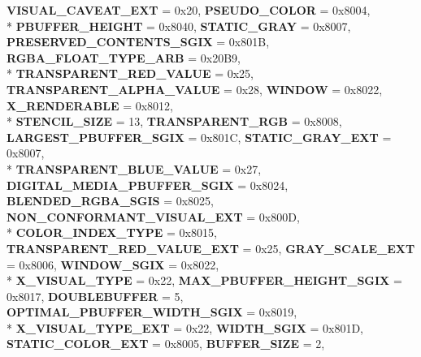 \begin{DoxyCompactItemize}
{\bfseries V\-I\-S\-U\-A\-L\-\_\-\-C\-A\-V\-E\-A\-T\-\_\-\-E\-X\-T} = 0x20, 
{\bfseries P\-S\-E\-U\-D\-O\-\_\-\-C\-O\-L\-O\-R} = 0x8004, 
\\*
{\bfseries P\-B\-U\-F\-F\-E\-R\-\_\-\-H\-E\-I\-G\-H\-T} = 0x8040, 
{\bfseries S\-T\-A\-T\-I\-C\-\_\-\-G\-R\-A\-Y} = 0x8007, 
{\bfseries P\-R\-E\-S\-E\-R\-V\-E\-D\-\_\-\-C\-O\-N\-T\-E\-N\-T\-S\-\_\-\-S\-G\-I\-X} = 0x801\-B, 
{\bfseries R\-G\-B\-A\-\_\-\-F\-L\-O\-A\-T\-\_\-\-T\-Y\-P\-E\-\_\-\-A\-R\-B} = 0x20\-B9, 
\\*
{\bfseries T\-R\-A\-N\-S\-P\-A\-R\-E\-N\-T\-\_\-\-R\-E\-D\-\_\-\-V\-A\-L\-U\-E} = 0x25, 
{\bfseries T\-R\-A\-N\-S\-P\-A\-R\-E\-N\-T\-\_\-\-A\-L\-P\-H\-A\-\_\-\-V\-A\-L\-U\-E} = 0x28, 
{\bfseries W\-I\-N\-D\-O\-W} = 0x8022, 
{\bfseries X\-\_\-\-R\-E\-N\-D\-E\-R\-A\-B\-L\-E} = 0x8012, 
\\*
{\bfseries S\-T\-E\-N\-C\-I\-L\-\_\-\-S\-I\-Z\-E} = 13, 
{\bfseries T\-R\-A\-N\-S\-P\-A\-R\-E\-N\-T\-\_\-\-R\-G\-B} = 0x8008, 
{\bfseries L\-A\-R\-G\-E\-S\-T\-\_\-\-P\-B\-U\-F\-F\-E\-R\-\_\-\-S\-G\-I\-X} = 0x801\-C, 
{\bfseries S\-T\-A\-T\-I\-C\-\_\-\-G\-R\-A\-Y\-\_\-\-E\-X\-T} = 0x8007, 
\\*
{\bfseries T\-R\-A\-N\-S\-P\-A\-R\-E\-N\-T\-\_\-\-B\-L\-U\-E\-\_\-\-V\-A\-L\-U\-E} = 0x27, 
{\bfseries D\-I\-G\-I\-T\-A\-L\-\_\-\-M\-E\-D\-I\-A\-\_\-\-P\-B\-U\-F\-F\-E\-R\-\_\-\-S\-G\-I\-X} = 0x8024, 
{\bfseries B\-L\-E\-N\-D\-E\-D\-\_\-\-R\-G\-B\-A\-\_\-\-S\-G\-I\-S} = 0x8025, 
{\bfseries N\-O\-N\-\_\-\-C\-O\-N\-F\-O\-R\-M\-A\-N\-T\-\_\-\-V\-I\-S\-U\-A\-L\-\_\-\-E\-X\-T} = 0x800\-D, 
\\*
{\bfseries C\-O\-L\-O\-R\-\_\-\-I\-N\-D\-E\-X\-\_\-\-T\-Y\-P\-E} = 0x8015, 
{\bfseries T\-R\-A\-N\-S\-P\-A\-R\-E\-N\-T\-\_\-\-R\-E\-D\-\_\-\-V\-A\-L\-U\-E\-\_\-\-E\-X\-T} = 0x25, 
{\bfseries G\-R\-A\-Y\-\_\-\-S\-C\-A\-L\-E\-\_\-\-E\-X\-T} = 0x8006, 
{\bfseries W\-I\-N\-D\-O\-W\-\_\-\-S\-G\-I\-X} = 0x8022, 
\\*
{\bfseries X\-\_\-\-V\-I\-S\-U\-A\-L\-\_\-\-T\-Y\-P\-E} = 0x22, 
{\bfseries M\-A\-X\-\_\-\-P\-B\-U\-F\-F\-E\-R\-\_\-\-H\-E\-I\-G\-H\-T\-\_\-\-S\-G\-I\-X} = 0x8017, 
{\bfseries D\-O\-U\-B\-L\-E\-B\-U\-F\-F\-E\-R} = 5, 
{\bfseries O\-P\-T\-I\-M\-A\-L\-\_\-\-P\-B\-U\-F\-F\-E\-R\-\_\-\-W\-I\-D\-T\-H\-\_\-\-S\-G\-I\-X} = 0x8019, 
\\*
{\bfseries X\-\_\-\-V\-I\-S\-U\-A\-L\-\_\-\-T\-Y\-P\-E\-\_\-\-E\-X\-T} = 0x22, 
{\bfseries W\-I\-D\-T\-H\-\_\-\-S\-G\-I\-X} = 0x801\-D, 
{\bfseries S\-T\-A\-T\-I\-C\-\_\-\-C\-O\-L\-O\-R\-\_\-\-E\-X\-T} = 0x8005, 
{\bfseries B\-U\-F\-F\-E\-R\-\_\-\-S\-I\-Z\-E} = 2, 

\end{DoxyCompactItemize}
